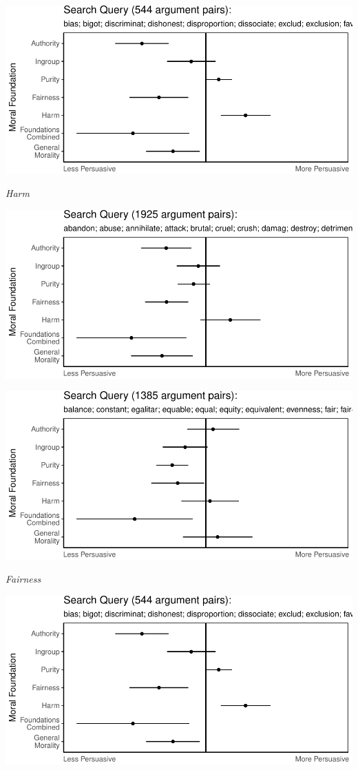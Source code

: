 \documentclass[11pt,]{article}
\begin{document}
\includegraphics{prelim_files/figure-latex/unnamed-chunk-10-1.pdf}

\emph{Harm}

\includegraphics{prelim_files/figure-latex/unnamed-chunk-11-1.pdf}

\includegraphics{prelim_files/figure-latex/unnamed-chunk-12-1.pdf}

\emph{Fairness}

\includegraphics{prelim_files/figure-latex/unnamed-chunk-13-1.pdf}
\end{document}

